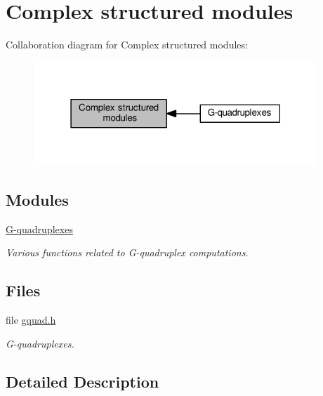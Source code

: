 \hypertarget{group__paired__modules}{}\section{Complex structured modules}
\label{group__paired__modules}
Collaboration diagram for Complex structured modules\+:
\nopagebreak
\begin{figure}[H]
\begin{center}
\leavevmode
\includegraphics[width=303pt]{group__paired__modules}
\end{center}
\end{figure}
\subsection*{Modules}
\begin{DoxyCompactItemize}
\item 
\hyperlink{group__gquads}{G-\/quadruplexes}
\begin{DoxyCompactList}\small\item\em Various functions related to G-\/quadruplex computations. \end{DoxyCompactList}\end{DoxyCompactItemize}
\subsection*{Files}
\begin{DoxyCompactItemize}
\item 
file \hyperlink{gquad_8h}{gquad.\+h}
\begin{DoxyCompactList}\small\item\em G-\/quadruplexes. \end{DoxyCompactList}\end{DoxyCompactItemize}


\subsection{Detailed Description}
